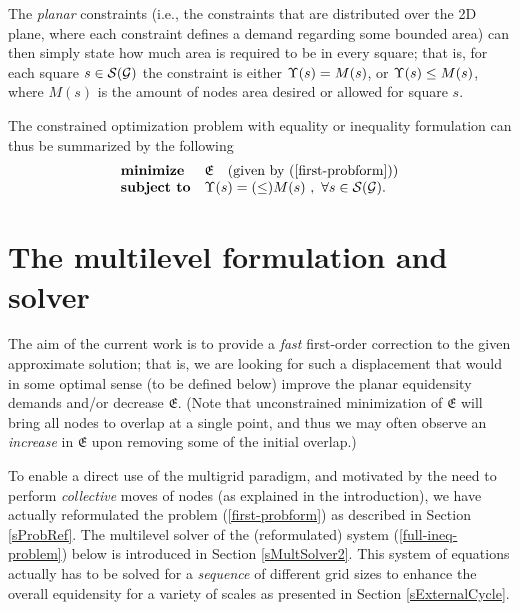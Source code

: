 \documentclass[final]{siamltex}
\begin{document}
\par The {\it planar} constraints (i.e., the constraints that are distributed over the 2D plane,
where each constraint defines a demand regarding some bounded
area) can then simply state how much area is required to be in
every square; that is, for each square $s\in \mathcal{S}(\mathcal{G})$ the constraint
is either $\Upsilon(s)=M(s)$, or $\Upsilon(s)\leq M(s)$, where $M(s)$ is
the amount of nodes area desired or allowed for square $s$.
\par The constrained optimization problem with equality or inequality formulation can thus be summarized by the
following
\begin{equation}\label{full-problem}
\begin{array}{ll}
\mbox{\textbf{minimize}}  & \mathfrak{E} ~~~ (\text{given by } (\ref{first-probform})) \\
\mbox{\textbf{subject to}} & \Upsilon(s)=(\leq) M(s)  ~,~ \forall s
\in \mathcal{S}(\mathcal{G}).
\end{array}
\end{equation}

\section{The multilevel formulation and solver}\label{ml-formulation}
\par The aim of the current work is to provide a {\it fast} first-order
correction to the given approximate solution; that is, we are
looking for such a displacement that would in some optimal sense
(to be defined below) improve the planar equidensity demands
and/or decrease $\mathfrak{E}$. (Note that unconstrained
minimization of $\mathfrak{E}$ will bring all nodes to overlap at
a single point, and thus we may often observe an {\it increase} in
$\mathfrak{E}$ upon removing some of the initial overlap.)
\par To enable a direct use of the multigrid paradigm, and motivated by the
need to perform {\it collective} moves of nodes (as explained in
the introduction), we have actually reformulated the problem
(\ref{first-probform}) as described in Section \ref{sProbRef}. The
multilevel solver of the (reformulated) system
(\ref{full-ineq-problem}) below is introduced in Section
\ref{sMultSolver2}. This system of equations actually has to be
solved for a {\it sequence} of different grid sizes to enhance the
overall equidensity for a variety of scales as presented in
Section \ref{sExternalCycle}.
\end{document}
